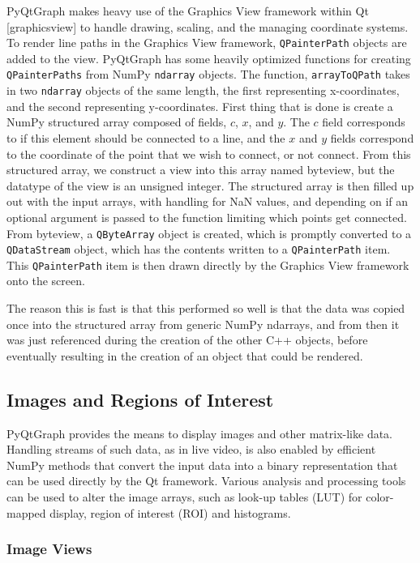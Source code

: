 \documentclass[journal]{vgtc}                %
\begin{document}
PyQtGraph makes heavy use of the Graphics View framework within Qt [graphicsview] to handle drawing, scaling, and the managing coordinate systems.  To render line paths in the Graphics View framework, \texttt{QPainterPath} objects are added to the view.  PyQtGraph has some heavily optimized functions for creating \texttt{QPainterPaths} from NumPy \texttt{ndarray} objects.  The function, \texttt{arrayToQPath} takes in two \texttt{ndarray} objects of the same length, the first representing x-coordinates, and the second representing y-coordinates. First thing that is done is create a NumPy structured array composed of fields, $c$, $x$, and $y$.  The $c$ field corresponds to if this element should be connected to a line, and the $x$ and $y$ fields correspond to the coordinate of the point that we wish to connect, or not connect.  From this structured array, we construct a view into this array named byteview, but the datatype of the view is an unsigned integer.  The structured array is then filled up out with the input arrays, with handling for NaN values, and depending on if an optional argument is passed to the function limiting which points get connected.  From byteview, a \texttt{QByteArray} object is created, which is promptly converted to a \texttt{QDataStream} object, which has the contents written to a \texttt{QPainterPath} item.  This \texttt{QPainterPath} item is then drawn directly by the Graphics View framework onto the screen.

The reason this is fast is that this performed so well is that the data was copied once into the structured array from generic NumPy ndarrays, and from then it was just referenced during the creation of the other C++ objects, before eventually resulting in the creation of an object that could be rendered.

\color{black}
\subsection{Images and Regions of Interest}

PyQtGraph provides the means to display images and other matrix-like data. Handling streams of such data, as in live video, is also enabled by efficient NumPy methods that convert the input data into a binary representation that can be used directly by the Qt framework. Various analysis and processing tools can be used to alter the image arrays, such as look-up tables (LUT) for color-mapped display, region of interest (ROI) and histograms.

\subsubsection{Image Views}
\end{document}
